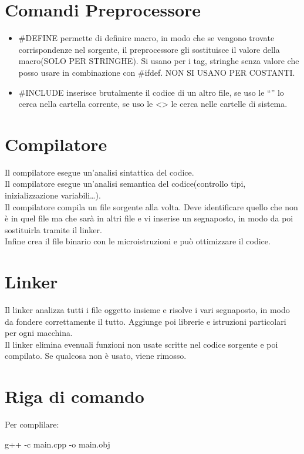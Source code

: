\section{Comandi Preprocessore}
\begin{itemize}
\item \#DEFINE permette di definire macro, in modo che se vengono trovate corrispondenze nel sorgente, il preprocessore gli sostituisce il valore della macro(SOLO PER STRINGHE). Si usano per i tag, stringhe senza valore che posso usare in combinazione con \#ifdef. NON SI USANO PER COSTANTI.
\item \#INCLUDE inserisce brutalmente il codice di un altro file, se uso le “” lo cerca nella cartella corrente, se uso le <> le cerca nelle cartelle di sistema.
\end{itemize}

\section{Compilatore}
Il compilatore esegue un'analisi sintattica del codice.\\
Il compilatore esegue un'analisi semantica del codice(controllo tipi, inizializzazione variabili\dots).\\
Il compilatore compila un file sorgente alla volta. Deve identificare quello che non è in quel file ma che sarà in altri file e vi inserise un segnaposto, in modo da poi sostituirla tramite il linker.\\
Infine crea il file binario con le microistruzioni e può ottimizzare il codice.

\section{Linker}
Il linker analizza tutti i file oggetto insieme e risolve i vari segnaposto, in modo da fondere correttamente il tutto. Aggiunge poi librerie e istruzioni particolari per ogni macchina.\\
Il linker elimina evenuali funzioni non usate scritte nel codice sorgente e poi compilato. Se qualcosa non è usato, viene rimosso.

\section{Riga di comando}
Per complilare:

\begin{tcolorbox}
g++ -c main.cpp -o main.obj 
\end{tcolorbox}

